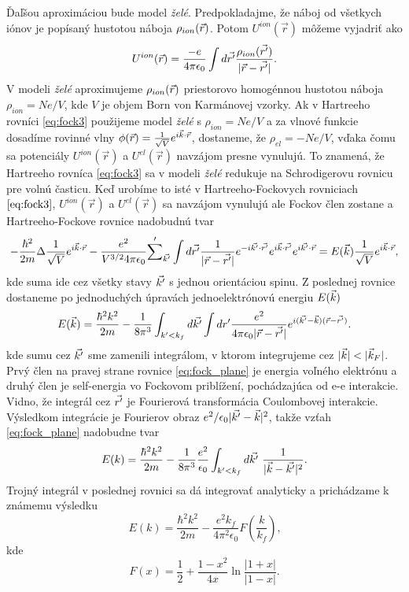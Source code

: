 Ďaľšou aproximáciou bude model \emph{želé}. Predpokladajme,
 že náboj od všetkych iónov je popísaný hustotou náboja $\rho_{ion}(\vec{r})$. Potom $U^{ion}(\vec{r})$ môžeme vyjadriť ako
\begin{equation}
\label{eq:ion_pudding}
U^{ion}(\vec{r}) = \frac{-e}{4\pi \epsilon_0}\int d\vec{r'} \frac{\rho_{ion}(\vec{r'})}{|\vec{r}-\vec{r'}|} \text{.}
\end{equation}
V modeli \emph{želé} aproximujeme $\rho_{ion}(\vec{r})$ priestorovo homogénnou hustotou náboja $\rho_{ion}=Ne/V$, kde $V$ je objem Born von Karmánovej vzorky.
Ak v Hartreeho rovníci \eqref{eq:fock3} použijeme model \emph{želé} s $\rho_{ion}=Ne/V$ a za vlnové funkcie dosadíme rovinné vlny $\phi(\vec{r})=\frac{1}{\sqrt{V}}e^{i\vec{k}\cdot\vec{r}}$,
dostaneme, že $\rho_{el}=-Ne/V$, vďaka čomu sa potenciály $U^{ion}(\vec{r})$ a $U^{el}(\vec{r})$ navzájom presne vynulujú.
To znamená, že Hartreeho rovníca \eqref{eq:fock3} sa v modeli \emph{želé} redukuje na Schrodigerovu rovnicu pre volnú časticu.
Keď urobíme to isté v Hartreeho-Fockovych rovniciach $\eqref{eq:fock3}$, $U^{ion}(\vec{r})$ a $U^{el}(\vec{r})$ sa navzájom vynulujú
ale Fockov člen zostane a Hartreeho-Fockove rovnice nadobudnú tvar
\begin{equation}
\label{eq:fock_final}
-\frac{\hbar^2}{2m}\Delta \frac{1}{\sqrt V}e^{i\vec{k}\cdot\vec{r}}-\frac{e^2}{V^{3/2}4\pi\epsilon_0}{\sum'}_{\vec{k'}}\int d\vec{r'} \frac{1}{|\vec{r}-\vec{r'}|} e^{-i\vec{k'} \cdot \vec{r'} }e^{i\vec{k} \cdot \vec{r'}}e^{i\vec{k'} \cdot \vec{r}}=E(\vec{k})\frac{1}{\sqrt V}e^{i\vec{k} \cdot \vec{r}} \text{,}
\end{equation}
kde suma ide cez všetky stavy $\vec{k'}$ s jednou orientáciou spinu. Z poslednej rovnice dostaneme po jednoduchých úpravách
jednoelektrónovú energiu $E(\vec{k})$ 
\begin{equation}
\label{eq:fock_plane}
E(\vec{k})=\frac{\hbar^2 k^2}{2m}- \frac{1}{8\pi^3} \int_{k'<k_f} d \vec{k'}\int dr'\frac{e^2}{4\pi\epsilon_0|\vec{r}-\vec{r'}|} e^{i(\vec{k'}-\vec{k})(\vec{r}-\vec{r'})} \text{.}
\end{equation}
kde sumu cez $\vec{k'}$ sme zamenili integrálom, v ktorom integrujeme cez $|\vk|<|\vk_F|$. Prvý člen
na pravej strane rovnice \eqref{eq:fock_plane} je energia voľného elektrónu a druhý člen je self-energia vo Fockovom priblížení,
pochádzajúca od e-e interakcie.
Vidno, že integrál cez $\vec{r'}$ je Fourierová transformácia Coulombovej interakcie. Výsledkom integrácie je Fourierov obraz $e^2/\epsilon_0|\vec{k'}-\vec{k}|^2$, takže vzťah 
\eqref{eq:fock_plane} nadobudne tvar
\begin{equation}
\label{eq:fock_plane2}
E(k)=\frac{\hbar^2 k^2}{2m}-\frac{1}{8\pi^3} \frac{e^2}{\epsilon_0} \int_{k'<k_f} d\vec{k'} \ \frac{1}{|\vec{k}-\vec{k'}|^2}\text{.}
\end{equation}
Trojný integrál v poslednej rovnici sa dá integrovať analyticky a prichádzame k známemu výsledku \cite{Mermin}
\begin{equation}
\label{eq:fock_erg}
E(k)=\frac{\hbar^2 k^2}{2m}- \frac{e^2 k_f}{4\pi^2\epsilon_0} F(\frac{k}{k_f}) \text{,}
\end{equation}
kde
\begin{equation}
\label{eq:fock_fx}
F(x)=\frac{1}{2}+\frac{1-x^2}{4x}\ln{\frac{|1+x|}{|1-x|}} \text{.}
\end{equation}


